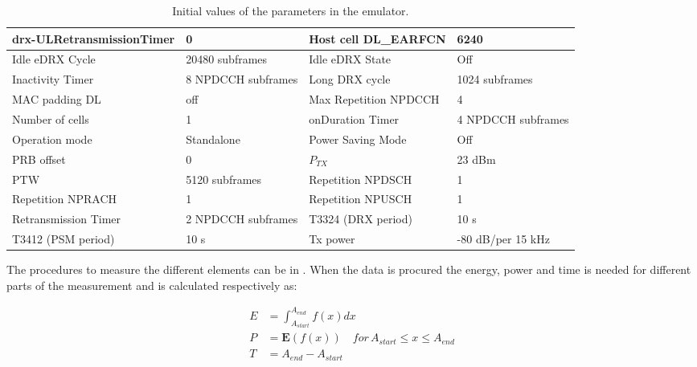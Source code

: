 \begin{table}[H]
{\begin{tabular}{|p{5cm}|p{3cm}|p{4cm}|p{3cm}|}
drx-ULRetransmissionTimer & 0        & Host cell DL\_EARFCN 	& 6240           \\ \hline
Idle eDRX Cycle     & 20480 subframes& Idle eDRX State        	& Off            \\ \hline
Inactivity Timer        & 8 NPDCCH subframes & Long DRX cycle   & 1024 subframes \\ \hline
MAC padding DL           & off       & Max Repetition NPDCCH 	& 4              \\ \hline
Number of cells          & 1         & onDuration Timer         & 4 NPDCCH subframes \\ \hline
Operation mode           & Standalone& Power Saving Mode		& Off            \\ \hline
PRB offset               & 0         &$P_{TX}$                  & 23 dBm         \\ \hline
\gls{PTW}                & 5120 subframes & Repetition NPDSCH   & 1              \\ \hline
Repetition NPRACH        & 1         & Repetition NPUSCH        & 1              \\ \hline
Retransmission Timer & 2 NPDCCH subframes & T3324 (DRX period)  & 10 s           \\ \hline
T3412 (PSM period)      & 10 s       & Tx power                 & -80 dB/per 15 kHz \\ \hline
\end{tabular}}
\caption{Initial values of the parameters in the emulator.}
\label{tab:setup_parameters}
\end{table}

The procedures to measure the different elements can be in . When the data is procured the energy, power and time is needed for different parts of the measurement and is calculated respectively as:

\begin{align}
E &= \int_{A_{start}}^{A_{end}} f(x) dx \label{eq:energy}\\
P &= \mathbf{E}(f(x)) \quad for \, A_{start} \leq x \leq A_{end} \label{eq:power} \\
T &=  A_{end} - A_{start} \label{eq:time}\\
\end{align}
\begin{where}
\end{where}

